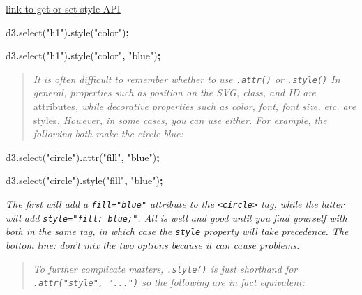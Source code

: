 \documentclass[
  openany]{book}
\newenvironment{Shaded}{\begin{snugshade}}{\end{snugshade}}
\newcommand{\FunctionTok}[1]{\textcolor[rgb]{0.00,0.00,0.00}{#1}}
\newcommand{\NormalTok}[1]{#1}
\newcommand{\OperatorTok}[1]{\textcolor[rgb]{0.81,0.36,0.00}{\textbf{#1}}}
\newcommand{\StringTok}[1]{\textcolor[rgb]{0.31,0.60,0.02}{#1}}
\begin{document}
\href{https://github.com/d3/d3-selection/blob/v1.4.0/README.md\#selection_style}{link to get or set style API}

\begin{Shaded}
\begin{Highlighting}[]
\NormalTok{d3}\OperatorTok{.}\FunctionTok{select}\NormalTok{(}\StringTok{"h1"}\NormalTok{)}\OperatorTok{.}\FunctionTok{style}\NormalTok{(}\StringTok{"color"}\NormalTok{)}\OperatorTok{;}

\NormalTok{d3}\OperatorTok{.}\FunctionTok{select}\NormalTok{(}\StringTok{"h1"}\NormalTok{)}\OperatorTok{.}\FunctionTok{style}\NormalTok{(}\StringTok{"color"}\OperatorTok{,} \StringTok{"blue"}\NormalTok{)}\OperatorTok{;}
\end{Highlighting}
\end{Shaded}

\begin{quote}
\emph{It is often difficult to remember whether to use \texttt{.attr()} or \texttt{.style()} In general, properties such as position on the SVG, class, and ID are }attributes\emph{, while decorative properties such as color, font, font size, etc. are }styles\emph{. However, in some cases, you can use either. For example, the following both make the circle blue:}
\end{quote}

\begin{Shaded}
\begin{Highlighting}[]
\NormalTok{d3}\OperatorTok{.}\FunctionTok{select}\NormalTok{(}\StringTok{"circle"}\NormalTok{)}\OperatorTok{.}\FunctionTok{attr}\NormalTok{(}\StringTok{"fill"}\OperatorTok{,} \StringTok{"blue"}\NormalTok{)}\OperatorTok{;}

\NormalTok{d3}\OperatorTok{.}\FunctionTok{select}\NormalTok{(}\StringTok{"circle"}\NormalTok{)}\OperatorTok{.}\FunctionTok{style}\NormalTok{(}\StringTok{"fill"}\OperatorTok{,} \StringTok{"blue"}\NormalTok{)}\OperatorTok{;}
\end{Highlighting}
\end{Shaded}

\emph{The first will add a \texttt{fill="blue"} attribute to the \texttt{\textless{}circle\textgreater{}} tag, while the latter will add \texttt{style="fill:\ blue;"}. All is well and good until you find yourself with both in the same tag, in which case the \texttt{style} property will take precedence. The bottom line: don't mix the two options because it can cause problems.}

\begin{quote}
\emph{To further complicate matters, \texttt{.style()} is just shorthand for \texttt{.attr("style",\ "...")} so the following are in fact equivalent:}
\end{quote}
\end{document}
